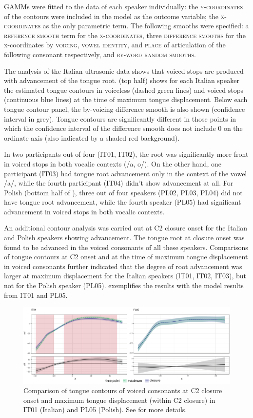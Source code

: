 \documentclass[authoryear, 5p]{elsarticle}
\begin{document}
GAMMs were fitted to the data of each speaker individually: the
\textsc{y-coordinates} of the contours were included in the model as the
outcome variable; the \textsc{x-coordinates} as the only parametric
term. The following smooths were specified: a \textsc{reference smooth}
term for the \textsc{x-coordinates}, three \textsc{difference smooths}
for the x-coordinates by \textsc{voicing}, \textsc{vowel identity}, and
\textsc{place} of articulation of the following consonant respectively,
and \textsc{by-word random smooths}.

The analysis of the Italian ultrasonic data shows that voiced stops are
produced with advancement of the tongue root.  (top half)
shows for each Italian speaker the estimated tongue contours in
voiceless (dashed green lines) and voiced stops (continuous blue lines)
at the time of maximum tongue displacement. Below each tongue contour
panel, the by-voicing difference smooth is also shown (confidence
interval in grey). Tongue contours are significantly different in those
points in which the confidence interval of the difference smooth does
not include 0 on the ordinate axis (also indicated by a shaded red
background).

In two participants out of four (IT01, IT02), the root was significantly
more front in voiced stops in both vocalic contexts (/a, o/). On the
other hand, one participant (IT03) had tongue root advancement only in
the context of the vowel /a/, while the fourth participant (IT04) didn't
show advancement at all. For Polish (bottom half of ), three
out of four speakers (PL02, PL03, PL04) did not have tongue root
advancement, while the fourth speaker (PL05) had significant advancement
in voiced stops in both vocalic contexts.

An additional contour analysis was carried out at C2 closure onset for
the Italian and Polish speakers showing advancement. The tongue root at
closure onset was found to be advanced in the voiced consonants of all
these speakers. Comparisons of tongue contours at C2 onset and at the
time of maximum tongue displacement in voiced consonants further
indicated that the degree of root advancement was larger at maximum
displacement for the Italian speakers (IT01, IT02, IT03), but not for
the Polish speaker (PL05).  exemplifies the results with
the model results from IT01 and PL05.

\begin{figure}
    \centering
    \includegraphics[width=.9\textwidth]{fig/voiced-colour.pdf}
    \caption{Comparison of tongue contours of voiced consonants at C2 closure onset and maximum tongue displacement (within C2 closure) in IT01 (Italian) and PL05 (Polish). See  for more details.}
    \label{f:voiced}
\end{figure}
\end{document}
